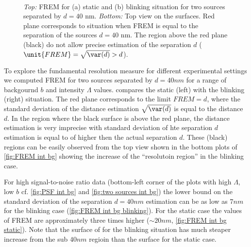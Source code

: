 \begin{figure}[!b]
	\centering
	\newcommand{\wf}{.48\textwidth}
	\\
	\caption{{\it Top:} FREM for (a) static and (b) blinking situation for two sources separated by $d=40$ nm. {\it Bottom:} Top view on the surfaces. Red plane corresponds to situation when FREM is equal to the separation of the sources $d=40$ nm. The region above the red plane (black) do not allow precise estimation of the separation $d$ ($\unit{FREM}=\sqrt{\var(d)}>d$).}
	\label{fig:FREM int bg}
\end{figure}
%
To explore the fundamental resolution measure for different experimental settings we computed FREM for two sources separated by $d=40\unit{nm}$ for a range of backgournd $b$ and intensity  $\Lambda$ values.  compares the static (left) with the blinking (right) situation. The red plane corresponds to the limit $\unit{FREM}=d$, where the standard deviation of the distance estimation $\sqrt{\var(d)}$ is equal to the distance $d$. In the region where the black surface is above the red plane, the distance estimation is very imprecise with standard deviation of hte separation $d$ estimation is equal to of higher then the actual separation $d$. These (black) regions can be easily observed from the top view shown in the bottom plots of \autoref{fig:FREM int bg} showing the increase of the ``resolutoin region'' in the blinking case. 

For high signal-to-noise ratio data (bottom-left corner of the plots with high $\Lambda$, low $b$ cf. \autoref{fig:PSF int bg} and \ref{fig:two sources int bg}) the lower bound on the standard deviation of the separation $d=40\unit{nm}$ estimation can be as low as $7\unit{nm}$ for the blinking case (\autoref{fig:FREM int bg blinking}). For the static case the values of FREM are approximately three times higher ($\sim 20\unit{nm}$,  \autoref{fig:FREM int bg static}). Note that the surface of for the blinking situation has much steaper increase from the sub $40\unit{nm}$ regioin than the surface for the static case.

